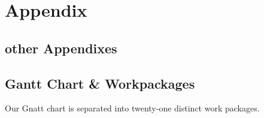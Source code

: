 \documentclass[lettersize,journal]{IEEEtran}
\begin{document}
\newpage



\section{Appendix}

\subsection{other Appendixes}


\cleardoublepage


\subsection{Gantt Chart \& Workpackages}


Our Gnatt chart is separated into twenty-one distinct work packages.
\end{document}
